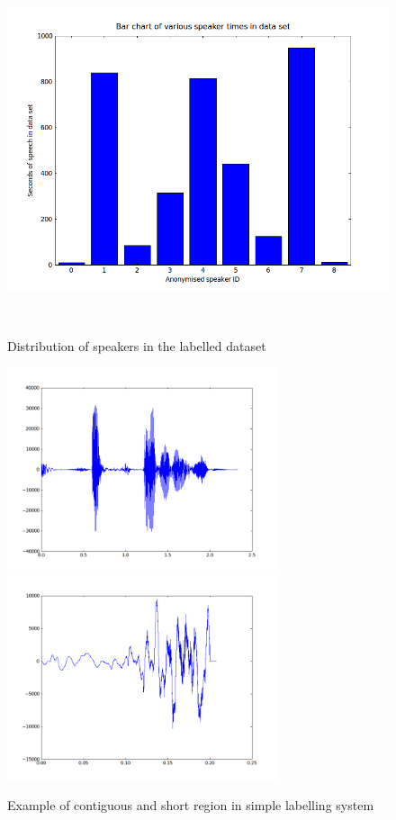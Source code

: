 \documentclass[ %
                    author={Sam Phippen},
                supervisor={Dr. Rafal Bogacz},
                     title={Real time voice activity detectors in noisy personal computing environments},
                  subtitle={},
                    degree={MEng},
                      year={2012} ]{thesis}
\begin{document}
\begin{figure}
    \includegraphics[height=10cm]{speaker.png}
    \label{img:speaker_distribution}
    \caption{Distribution of speakers in the labelled dataset}
\end{figure}

\begin{figure}
    \includegraphics[width=8cm]{labelling1.png}
    \includegraphics[width=8cm]{labelling2.png}
    \label{img:labelling_example}
    \caption{Example of contiguous and short region in simple labelling system}
\end{figure}
\end{document}
